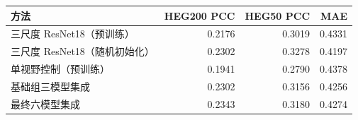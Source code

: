\begin{tabular}{lrrr}
\toprule
方法 & HEG200 PCC & HEG50 PCC & MAE \\
\midrule
三尺度 ResNet18（预训练） & 0.2176 & 0.3019 & 0.4331 \\
三尺度 ResNet18（随机初始化） & 0.2302 & 0.3278 & 0.4197 \\
单视野控制（预训练） & 0.1941 & 0.2790 & 0.4378 \\
基础组三模型集成 & 0.2302 & 0.3156 & 0.4256 \\
最终六模型集成 & 0.2343 & 0.3180 & 0.4274 \\
\bottomrule
\end{tabular}
